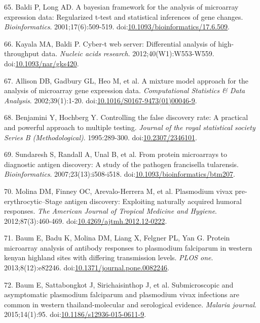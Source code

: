 \documentclass[]{article}
\begin{document}
\hypertarget{ref-baldi2001cybert}{}
65. Baldi P, Long AD. A bayesian framework for the analysis of
microarray expression data: Regularized t-test and statistical
inferences of gene changes. \emph{Bioinformatics}. 2001;17(6):509-519.
doi:\href{https://doi.org/10.1093/bioinformatics/17.6.509}{10.1093/bioinformatics/17.6.509}.

\hypertarget{ref-kayala2012cyber}{}
66. Kayala MA, Baldi P. Cyber-t web server: Differential analysis of
high-throughput data. \emph{Nucleic acids research}.
2012;40(W1):W553-W559.
doi:\href{https://doi.org/10.1093/nar/gks420}{10.1093/nar/gks420}.

\hypertarget{ref-allison2002mmm}{}
67. Allison DB, Gadbury GL, Heo M, et al. A mixture model approach for
the analysis of microarray gene expression data. \emph{Computational
Statistics \& Data Analysis}. 2002;39(1):1-20.
doi:\href{https://doi.org/10.1016/S0167-9473(01)00046-9}{10.1016/S0167-9473(01)00046-9}.

\hypertarget{ref-benjamini1995fdr}{}
68. Benjamini Y, Hochberg Y. Controlling the false discovery rate: A
practical and powerful approach to multiple testing. \emph{Journal of
the royal statistical society Series B (Methodological)}. 1995:289-300.
doi:\href{https://doi.org/10.2307/2346101}{10.2307/2346101}.

\hypertarget{ref-sundaresh2007}{}
69. Sundaresh S, Randall A, Unal B, et al. From protein microarrays to
diagnostic antigen discovery: A study of the pathogen francisella
tularensis. \emph{Bioinformatics}. 2007;23(13):i508-i518.
doi:\href{https://doi.org/10.1093/bioinformatics/btm207}{10.1093/bioinformatics/btm207}.

\hypertarget{ref-molina2012}{}
70. Molina DM, Finney OC, Arevalo-Herrera M, et al. Plasmodium vivax
pre-erythrocytic--Stage antigen discovery: Exploiting naturally acquired
humoral responses. \emph{The American Journal of Tropical Medicine and
Hygiene}. 2012;87(3):460-469.
doi:\href{https://doi.org/10.4269/ajtmh.2012.12-0222}{10.4269/ajtmh.2012.12-0222}.

\hypertarget{ref-baum2013}{}
71. Baum E, Badu K, Molina DM, Liang X, Felgner PL, Yan G. Protein
microarray analysis of antibody responses to plasmodium falciparum in
western kenyan highland sites with differing transmission levels.
\emph{PLOS one}. 2013;8(12):e82246.
doi:\href{https://doi.org/10.1371/journal.pone.0082246}{10.1371/journal.pone.0082246}.

\hypertarget{ref-baum2015}{}
72. Baum E, Sattabongkot J, Sirichaisinthop J, et al. Submicroscopic and
asymptomatic plasmodium falciparum and plasmodium vivax infections are
common in western thailand-molecular and serological evidence.
\emph{Malaria journal}. 2015;14(1):95.
doi:\href{https://doi.org/10.1186/s12936-015-0611-9}{10.1186/s12936-015-0611-9}.
\end{document}

